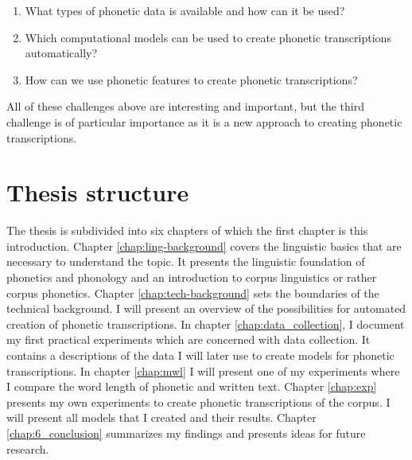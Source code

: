 \begin{enumerate}
\item What types of phonetic data is available and how can it be used?
\item Which computational models can be used to create phonetic transcriptions automatically?
\item How can we use phonetic features to create phonetic transcriptions?
\end{enumerate}

All of these challenges above are interesting and important, but the third challenge is of particular importance as it is a new approach to creating phonetic transcriptions. 

\section{Thesis structure}

The thesis is subdivided into six chapters of which the first chapter is this introduction. Chapter \ref{chap:ling-background} covers the linguistic basics that are necessary to understand the topic. It presents the linguistic foundation of phonetics and phonology and an introduction to corpus linguistics or rather corpus phonetics. Chapter \ref{chap:tech-background} sets the boundaries of the technical background. I will present an overview of the possibilities for automated creation of phonetic transcriptions. In chapter \ref{chap:data_collection}, I document my first practical experiments which are concerned with data collection. It contains a descriptions of the data I will later use to create models for phonetic transcriptions. In chapter \ref{chap:mwl} I will present one of my experiments where I compare the word length of phonetic and written text. Chapter \ref{chap:exp} presents my own experiments to create phonetic transcriptions of the corpus. I will present all models that I created and their results. Chapter \ref{chap:6_conclusion} summarizes my findings and presents ideas for future research.


